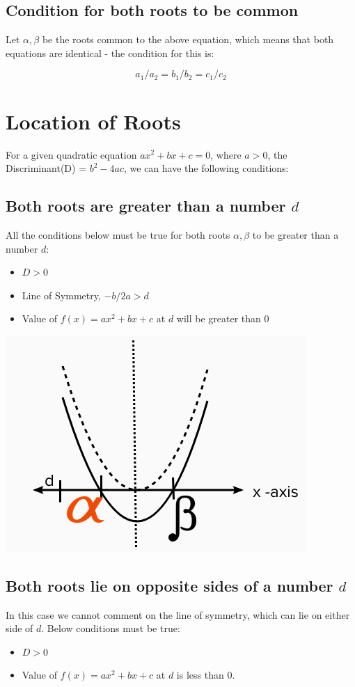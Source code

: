 \documentclass{book}
\begin{document}
	\subsection{Condition for both roots to be common}
	Let $\alpha, \beta$ be the roots common to the above equation, which means that both equations are identical - the condition for this is:
	
	\begin{mdframed}[backgroundcolor=yellow]
		$$a_1/a_2 = b_1/b_2 = c_1/c_2$$
	\end{mdframed}
	
	\section{Location of Roots}
	For a given quadratic equation $ax^2 + bx + c = 0$, where $a>0$, the Discriminant(D) = $b^2-4ac$, we can have the following conditions:
	\subsection{Both roots are greater than a number $d$}
	All the conditions below must be true  for both roots $\alpha, \beta$ to be greater than a number $d$:
	\begin{itemize}
		\item $D>0$
		\item Line of Symmetry, $-b/2a > d$
		\item Value of $f(x) = ax^2 + bx + c$ at $d$ will be greater than $0$ 
	\end{itemize}
	
	\includegraphics[scale=0.6]{condition1}
	
	\subsection{Both roots lie on opposite sides of a number $d$}
	In this case we cannot comment on the line of symmetry, which can lie on either side of $d$. Below conditions must be true:
	\begin{itemize}
		\item $D>0$
		\item Value of $f(x) = ax^2 +bx + c$ at $d$ is less than $0$.
	\end{itemize}
	
\end{document}
